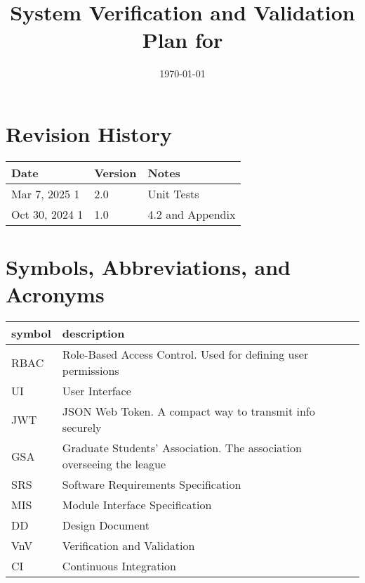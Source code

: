 \documentclass[12pt, titlepage]{article}
\begin{document}
\title{System Verification and Validation Plan for \progname{}}
\author{\authname}
\date{\today}

\maketitle


\section*{Revision History}

\begin{tabularx}{\textwidth}{p{3cm}p{2cm}X}
    \toprule {\bf Date} & {\bf Version} & {\bf Notes}      \\
    \midrule
    Mar 7, 2025 1      & 2.0           & Unit Tests \\
    Oct 30, 2024 1      & 1.0           & 4.2 and Appendix \\

    \bottomrule
\end{tabularx}


\newpage

\tableofcontents

\listoftables


\newpage

\section{Symbols, Abbreviations, and Acronyms}

\renewcommand{\arraystretch}{1.2}
\begin{tabular}{l l}
    \toprule
    \textbf{symbol} & \textbf{description}                                                  \\
    \midrule
    RBAC            & Role-Based Access Control. Used for defining user permissions         \\
    UI              & User Interface                                                        \\
    JWT             & JSON Web Token. A compact way to transmit info securely               \\
    GSA             & Graduate Students' Association. The association overseeing the league \\
    SRS             & Software Requirements Specification                                   \\
    MIS             & Module Interface Specification                                        \\
    DD              & Design Document                                                       \\
    VnV             & Verification and Validation                                           \\
    CI              & Continuous Integration                                                \\
    \bottomrule
\end{tabular}\\
\end{document}
